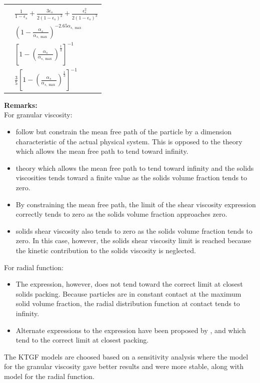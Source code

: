 \documentclass[11pt]{report}
\begin{document}
\begin{table}[h!]
\begin{center}
{\begin{tabular}{p{2.5cm}|p{13cm}}
\hline\\
\bf\citet{Carnahan-1969} &$
\displaystyle  \frac{1}{1-\epsilon_{s}}+\frac{3 \epsilon_{s}}{2\left(1-\epsilon_{s}\right)^{2}}+\frac{\epsilon_{s}^{2}}{2\left(1-\epsilon_{s}\right)^{3}}
$\\
\bf\citet{lun1986}&$
\displaystyle  \left(1-\frac{\alpha_{s}}{\alpha_{s, \max }}\right)^{-2.65 \alpha_{s, \max }}
$\\
\bf\citet{sinclair-1989} &$
\displaystyle  \left[1-\left(\frac{\alpha_{s}}{\alpha_{s, \max }}\right)^{\frac{1}{3}}\right]^{-1}
$\\
\bf\citet{GID-1994} & $ \displaystyle  \frac{3}{5}\left[1-\left(\frac{\alpha_{s}}{\alpha_{s, \max }}\right)^{\frac{1}{3}}\right]^{-1}
$\\

\hline
\end{tabular}}
\end{center}
\end{table}

\textbf{Remarks:}\\
%
For granular viscosity: 
%
\begin{itemize}
%
\item \citet{henrya}  follow \citet{Lun_1984}  but constrain the mean free path of the particle by a dimension characteristic of the actual physical system. 
%
This is opposed to the \citet{Lun_1984}  theory which allows the mean free path to tend toward infinity.
%
\item \citet{Lun_1984}  theory which allows the mean free path to tend toward infinity and the solids viscosities tends toward a finite value as the solids volume fraction tends to zero.
%
\item By constraining the mean free path, the limit of the \citet{henrya}  shear viscosity expression correctly tends to zero as the solids volume fraction approaches zero.
%
\item \citet{symlal1993} solids shear viscosity also tends to zero as the solids volume fraction tends to zero. 
%
In this case, however, the solids shear viscosity limit is reached because the kinetic contribution to the solids viscosity is neglected.
%
\end{itemize}
%
For radial function:
%
\begin{itemize}
%
\item  The \citet{Carnahan-1969} expression, however, does not tend toward the correct limit at closest solids packing. 
%
Because particles are in constant contact at the maximum solid volume fraction, the radial distribution function at contact tends to infinity.
% 
\item Alternate expressions to the \citet{Carnahan-1969} expression have been proposed by \citet{GID-1994}, \citet{lun1986} and \citet{sinclair-1989} which tend to the correct limit at closest packing.
%
\end{itemize}
%
The KTGF models are choosed based on a sensitivity analysis where the \citet{symlal1993} model for the granular viscosity gave better results and were more stable, along with \citet{sinclair-1989} model for the radial function.
%
\end{document}
